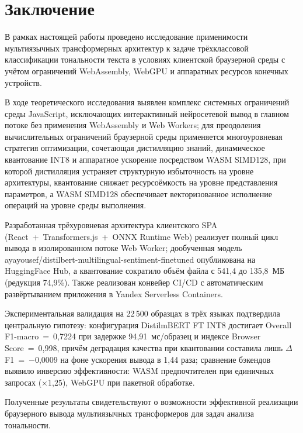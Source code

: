 \chapter*{Заключение}
\label{ch:Заключение}

В рамках настоящей работы проведено исследование применимости мультиязычных трансформерных архитектур к задаче трёхклассовой классификации тональности текста в условиях клиентской браузерной среды с учётом ограничений WebAssembly, WebGPU и аппаратных ресурсов конечных устройств.

В ходе теоретического исследования выявлен комплекс системных ограничений среды JavaScript, исключающих интерактивный нейросетевой вывод в главном потоке без применения WebAssembly и Web Workers; для преодоления вычислительных ограничений браузерной среды применяется многоуровневая стратегия оптимизации, сочетающая дистилляцию знаний, динамическое квантование INT8 и аппаратное ускорение посредством WASM SIMD128, при которой дистилляция устраняет структурную избыточность на уровне архитектуры, квантование снижает ресурсоёмкость на уровне представления параметров, а WASM SIMD128 обеспечивает векторизованное исполнение операций на уровне среды выполнения.

Разработанная трёхуровневая архитектура клиентского SPA (React~+~Transformers.js~+~ONNX Runtime Web) реализует полный цикл вывода в изолированном потоке Web Worker; дообученная модель ayayousef/distilbert-multilingual-sentiment-finetuned опубликована на HuggingFace Hub, а квантование сократило объём файла с 541{,}4 до 135{,}8~МБ (редукция 74{,}9\%). Также реализован конвейер CI/CD с автоматическим развёртыванием приложения в Yandex Serverless Containers.

Экспериментальная валидация на 22\,500 образцах в трёх языках подтвердила центральную гипотезу: конфигурация DistilmBERT FT INT8 достигает Overall F1-macro~=~0{,}7224 при задержке 94{,}91~мс/образец и индексе Browser Score~=~0{,}998, причём деградация качества при квантовании составила лишь $\Delta$F1~=~$-$0{,}0009 на фоне ускорения вывода в 1{,}44 раза; сравнение бэкендов выявило инверсию эффективности: WASM предпочтителен при единичных запросах ($\times$1{,}25), WebGPU при пакетной обработке.

Полученные результаты свидетельствуют о возможности эффективной реализации браузерного вывода мультиязычных трансформеров для задач анализа тональности.